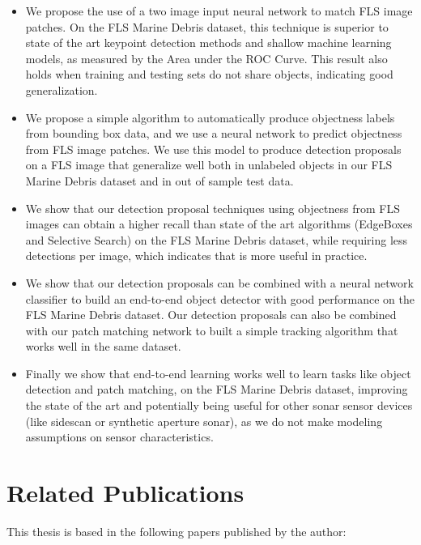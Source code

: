 \begin{itemize}
	\item We propose the use of a two image input neural network to match FLS image patches. On the FLS Marine Debris dataset, this technique is superior to state of the art keypoint detection methods\cite{rublee2011orb} and shallow machine learning models, as measured by the Area under the ROC Curve. This result also holds when training and testing sets do not share objects, indicating good generalization.
    
	\item We propose a simple algorithm to automatically produce objectness labels from bounding box data, and we use a neural network to predict objectness from FLS image patches. We use this model to produce detection proposals on a FLS image that generalize well both in unlabeled objects in our FLS Marine Debris dataset and in out of sample test data.
    \item We show that our detection proposal techniques using objectness from FLS images can obtain a higher recall than state of the art algorithms (EdgeBoxes\cite[-8em]{zitnick2014edge} and Selective Search\cite[-2em]{uijlings2013selective}) on the FLS Marine Debris dataset, while requiring less detections per image, which indicates that is more useful in practice.
	\item We show that our detection proposals can be combined with a neural network classifier to build an end-to-end object detector with good performance on the FLS Marine Debris dataset. Our detection proposals can also be combined with our patch matching network to built a simple tracking algorithm that works well in the same dataset.
    
	\item Finally we show that end-to-end learning works well to learn tasks like object detection and patch matching, on the FLS Marine Debris dataset, improving the state of the art and potentially being useful for other sonar sensor devices (like sidescan or synthetic aperture sonar), as we do not make modeling assumptions on sensor characteristics.
\end{itemize}

\section{Related Publications}

This thesis is based in the following papers published by the author:

